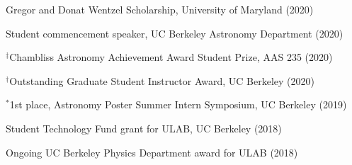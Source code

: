 \documentclass[12pt,letterpaper]{article}
\begin{document}
\begin{list}{}{\cvlist}

\item Gregor and Donat Wentzel Scholarship, University of Maryland (2020)
\item Student commencement speaker, UC Berkeley Astronomy Department (2020)
\item $^\ddagger$Chambliss Astronomy Achievement Award Student Prize, AAS 235 (2020)
\item $^\dagger$Outstanding Graduate Student Instructor Award, UC Berkeley (2020)
\item $^*$1st place, Astronomy Poster Summer Intern Symposium, UC Berkeley (2019)
\item Student Technology Fund grant for ULAB, UC Berkeley (2018)
\item Ongoing UC Berkeley Physics Department award for ULAB (2018)

\end{list}


\ifdefined\withpubs
    

    \begin{list}{}{\cvlist}
    
    \end{list}

    \begin{list}{}{\cvlist}
    
    \end{list}
\fi
\end{document}
